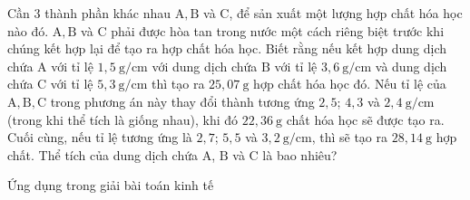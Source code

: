 \begin{vd}%
	Cần 3 thành phần khác nhau $\mathrm{A}, \mathrm{B}$ và $\mathrm{C}$, để sản xuất một lượng hợp chất hóa học nào đó. $\mathrm{A}, \mathrm{B}$ và C phải được hòa tan trong nước một cách riêng biệt trước khi chúng kết hợp lại để tạo ra hợp chất hóa học. Biết rằng nếu kết hợp dung dịch chứa $\mathrm{A}$ với tỉ lệ $1{,}5 \mathrm{~g} / \mathrm{cm}$ với dung dịch chứa $\mathrm{B}$ với tỉ lệ $3{,}6 \mathrm{~g} / \mathrm{cm}$ và dung dịch chứa $\mathrm{C}$ với tỉ lệ $5{,}3 \mathrm{~g} / \mathrm{cm}$ thì tạo ra $25{,}07 \mathrm{~g}$ hợp chất hóa học đó. Nếu tỉ lệ của $\mathrm{A}, \mathrm{B}, \mathrm{C}$ trong phương án này thay đổi thành tương ứng $2{,}5$; $4{,}3$ và $2{,}4 \mathrm{~g} / \mathrm{cm}$ (trong khi thể tích là giống nhau), khi đó $22{,}36 \mathrm{~g}$ chất hóa học sẽ được tạo ra. Cuối cùng, nếu tỉ lệ tương ứng là $2{,}7$; $5{,}5$ và $3{,}2 \mathrm{~g} / \mathrm{cm}$, thì sẽ tạo ra $28{,}14 \mathrm{~g}$ hợp chất. Thể tích của dung dịch chứa $\mathrm{A}$, $\mathrm{B}$ và $\mathrm{C}$ là bao nhiêu?
	\end{vd}
\begin{dang}{Ứng dụng trong giải bài toán kinh tế}
	
	\end{dang}
